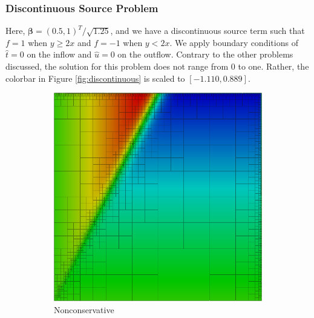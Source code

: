 \documentclass[letterpaper]{article}
\def\bbeta{\boldsymbol\beta}
\begin{document}
\subsubsection{Discontinuous Source Problem}
Here, $\bbeta=(0.5,1)^T/\sqrt{1.25}$, and we have a discontinuous source term
such that $f=1$ when $y\ge2x$ and $f=-1$ when $y<2x$. We apply boundary
conditions of $\hat t=0$ on the inflow and $\hat u=0$ on the outflow. Contrary
to the other problems discussed, the solution for this problem does not range
from 0 to one. Rather, the colorbar in Figure \ref{fig:discontinuous} is
scaled to  $[-1.110,0.889]$.

\begin{figure}[p]
\centering
\begin{subfigure}[t]{0.45\textwidth}
\centering
\includegraphics[width=\textwidth]{figs/Discontinuous/modified8nc.png}
\caption{Nonconservative}
\label{fig:discontinuousModified8nc}
\end{subfigure}
\begin{subfigure}[t]{0.45\textwidth}
\centering

\end{subfigure}
\end{figure}
\end{document}
